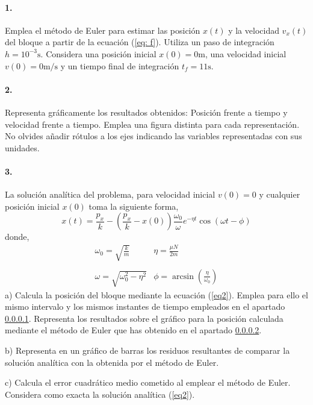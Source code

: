 \paragraph{1.} \label{p1} Emplea el método de Euler para estimar las posición $x(t)$ y la velocidad $v_x(t)$ del bloque a partir de la ecuación (\ref{eq: f}). Utiliza un paso de integración $h =10^{-3}\text{s}$. Considera una posición inicial $x(0) =0\text{m}$, una velocidad inicial $v(0) = 0\text{m/s}$ y un tiempo final de integración $t_{f}=11\text{s}$.

\paragraph{2.} \label{p2} Representa gráficamente los resultados obtenidos: Posición frente a tiempo y velocidad frente a tiempo. Emplea una figura distinta para cada representación. No olvides añadir rótulos a los ejes indicando las variables representadas con sus unidades.

\paragraph{3.} La solución analítica del problema, para velocidad inicial $v(0)=0$ y cualquier posición inicial $x(0)$ toma la siguiente forma,
\begin{equation}\label{eq2}
	x(t) = \frac{p_x}{k}-\left(\frac{p_x}{k}-x(0)\right)\frac{\omega_0}{\omega}e^{-\eta t}\cos\left(\omega t-\phi \right)
\end{equation}
donde,
\begin{equation}
\begin{matrix}
\omega_0 = \sqrt{\frac{k}{m}} & \eta = \frac{\mu N}{2m}\\
\ & \ \\
\omega = \sqrt{\omega_0^2 -\eta^2} &
\phi = \arcsin \left(\frac{\eta}{\omega_0}\right)
\end{matrix} \nonumber
\end{equation}
a) Calcula la posición del bloque mediante la ecuación (\ref{eq2}). Emplea para ello el mismo intervalo y los mismos instantes de tiempo empleados en el apartado \ref{p1}. Representa los resultados sobre el gráfico  para la posición calculada mediante el método de Euler que has obtenido en el apartado \ref{p2}. 

b) Representa en un gráfico de barras los residuos resultantes de comparar la solución analítica con la obtenida por el método de Euler.

c) Calcula el error cuadrático medio cometido al emplear el método de Euler. Considera como exacta la solución analítica (\ref{eq2}).



